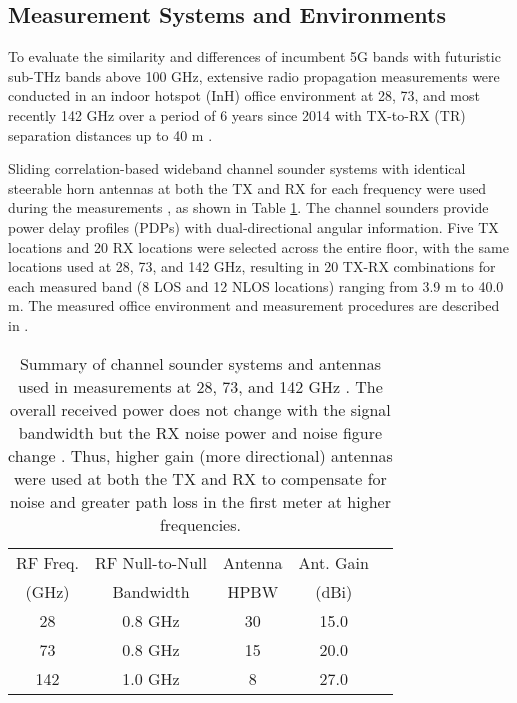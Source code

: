 \documentclass[conference]{IEEEtran}
\begin{document}
\subsection{Measurement Systems and Environments}
To evaluate the similarity and differences of incumbent 5G bands with futuristic sub-THz bands above 100 GHz, extensive radio propagation measurements were conducted in an indoor hotspot (InH) office environment at 28, 73, and most recently 142 GHz over a period of 6 years since 2014 with TX-to-RX (TR) separation distances up to 40 m \cite{Ju20a}. 

Sliding correlation-based wideband channel sounder systems with identical steerable horn antennas at both the TX and RX for each frequency were used during the measurements \cite{Mac17JSACb,rappaport2013millimeter,xing18GC}, as shown in Table \ref{tab:sounder}. The channel sounders provide power delay profiles (PDPs) with dual-directional angular information. Five TX locations and 20 RX locations were selected across the entire floor, with the same locations used at 28, 73, and 142 GHz, resulting in 20 TX-RX combinations for each measured band (8 LOS and 12 NLOS locations) ranging from 3.9 m to 40.0 m. The measured office environment and measurement procedures are described in \cite{Ju20a,Mac15b}.

\begin{table}[]\caption{Summary of channel sounder systems and antennas used in measurements at 28, 73, and 142 GHz \cite{rappaport2013millimeter,Mac17JSACb,xing18GC}. The overall received power does not change with the signal bandwidth but the RX noise power and noise figure change \cite{Rap02a}. Thus, higher gain (more directional) antennas were used at both the TX and RX to compensate for noise and greater path loss in the first meter at higher frequencies.}\label{tab:sounder}
	\centering
	\begin{tabular}{lllll}
		\hline
		\multicolumn{1}{|l|}{RF Freq.}   & \multicolumn{1}{l|}{ RF Null-to-Null} &  \multicolumn{1}{l|}{Antenna} & \multicolumn{1}{c|}{Ant. Gain} \\ 
		\multicolumn{1}{|c|}{(GHz)}   & \multicolumn{1}{c|}{ Bandwidth} &  \multicolumn{1}{c|}{HPBW} & \multicolumn{1}{c|}{(dBi)} \\ \hline
		\multicolumn{1}{|c|}{28  \cite{rappaport2013millimeter}}           & \multicolumn{1}{c|}{0.8 GHz }       & \multicolumn{1}{c|}{30\textdegree}           & \multicolumn{1}{c|}{15.0  }              \\ \hline
		\multicolumn{1}{|c|}{73  \cite{Mac17JSACb}}      & \multicolumn{1}{c|}{0.8 GHz}     & \multicolumn{1}{c|}{15\textdegree}           & \multicolumn{1}{c|}{20.0 }              \\ \hline
		\multicolumn{1}{|c|}{142  \cite{xing18GC}}         & \multicolumn{1}{c|}{1.0 GHz}      & \multicolumn{1}{c|}{8\textdegree}            & \multicolumn{1}{c|}{27.0 }              \\ \hline
	\end{tabular}
\vspace{-0.5cm}
\end{table}
\end{document}
